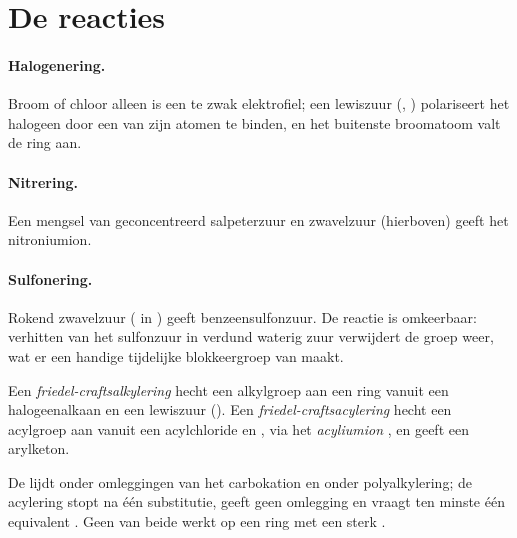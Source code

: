 \section{De reacties}

\paragraph{Halogenering.} Broom of chloor alleen is een te zwak elektrofiel; een lewiszuur
(, ) polariseert het halogeen door een van zijn atomen te binden, en het buitenste
broomatoom valt de ring aan.

\paragraph{Nitrering.} Een mengsel van geconcentreerd salpeterzuur en zwavelzuur (hierboven) geeft het
nitroniumion.

\paragraph{Sulfonering.} Rokend zwavelzuur ( in ) geeft benzeensulfonzuur.
De reactie is omkeerbaar: verhitten van het sulfonzuur in verdund waterig zuur verwijdert de
groep  weer, wat er een handige tijdelijke blokkeergroep van maakt.

\begin{definition}\label{def:b2:aromatic-substitution:friedel-crafts}
Een \emph{friedel-craftsalkylering} hecht een alkylgroep
aan een  ring vanuit een halogeenalkaan en een lewiszuur (). Een
\emph{friedel-craftsacylering} hecht een acylgroep
 aan vanuit een acylchloride en , via het \emph{acyliumion}
, en geeft een arylketon.
\end{definition}

\begin{proposition}\label{prop:b2:aromatic-substitution:friedel-crafts-limits}
De  lijdt onder omleggingen van het carbokation en onder
polyalkylering; de acylering stopt na één substitutie, geeft geen omlegging en vraagt ten
minste één equivalent . Geen van beide werkt op een ring met een sterk .
\end{proposition}

